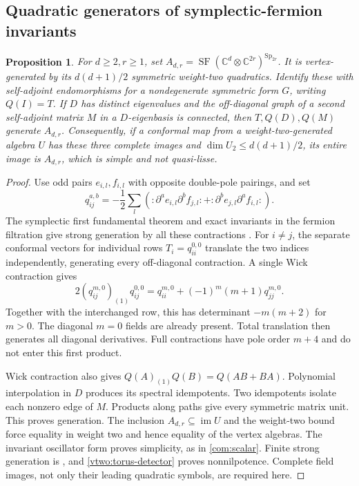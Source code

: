\documentclass[11pt,a4paper]{amsart}
\numberwithin{equation}{section}
\newtheorem{proposition}[theorem]{Proposition}
\theoremstyle{definition}
\theoremstyle{remark}
\newcommand{\C}{\mathbb C}
\newcommand{\SF}{\operatorname{SF}}
\newcommand{\Sp}{\operatorname{Sp}}
\newcommand{\im}{\operatorname{im}}
\begin{document}
\subsection{Quadratic generators of symplectic-fermion invariants}
\begin{proposition}\label{v3:quadratic-generation}
For $d\ge2,r\ge1$, set
$A_{d,r}=\SF(\C^d\otimes\C^{2r})^{\Sp_{2r}}$.
It is vertex-generated by its $d(d+1)/2$ symmetric weight-two
quadratics. Identify these with self-adjoint endomorphisms for a
nondegenerate symmetric form $G$, writing $Q(I)=T$.
If $D$ has distinct eigenvalues and the off-diagonal graph of a second
self-adjoint matrix $M$ in a $D$-eigenbasis is connected, then
$T,Q(D),Q(M)$ generate $A_{d,r}$.
Consequently, if a conformal map from a weight-two-generated algebra
$U$ has these three complete images and $\dim U_2\le d(d+1)/2$,
its entire image is $A_{d,r}$, which is simple and not quasi-lisse.
\end{proposition}
\begin{proof}
Use odd pairs $e_{i,l},f_{i,l}$ with opposite double-pole pairings,
and set
$$
 q_{ij}^{a,b}=-\frac12\sum_l
 (:\partial^ae_{i,l}\partial^bf_{j,l}:
       +:\partial^be_{j,l}\partial^af_{i,l}:).
$$
The symplectic first fundamental theorem and exact invariants in the
fermion filtration give strong generation by all these contractions
\cite[\S3, (3.10)]{CLSF}. For $i\ne j$, the separate conformal vectors for individual rows
$T_i=q_{ii}^{0,0}$ translate the two indices independently, generating
every off-diagonal contraction. A single Wick contraction gives
$$
 2(q_{ij}^{m,0})_{(1)}q_{ij}^{0,0}
     =q_{ii}^{m,0}+(-1)^m(m+1)q_{jj}^{m,0}.
$$
Together with the interchanged row, this has determinant $-m(m+2)$
for $m>0$. The diagonal $m=0$ fields are already present. Total
translation then generates all diagonal derivatives. Full contractions
have pole order $m+4$ and do not enter this first product.

Wick contraction also gives $Q(A)_{(1)}Q(B)=Q(AB+BA)$.
Polynomial interpolation in $D$ produces its spectral idempotents.
Two idempotents isolate each nonzero edge of $M$. Products along paths
give every symmetric matrix unit. This proves generation. The inclusion
$A_{d,r}\subseteq\im U$ and the weight-two bound force equality in
weight two and hence equality of the vertex algebras. The invariant
oscillator form proves simplicity, as in \cref{com:scalar}. Finite strong
generation is \cite[Theorem 3.10]{CLSF}, and \cref{vtwo:torus-detector} proves nonnilpotence. Complete field images,
not only their leading quadratic symbols, are required here.
\end{proof}
\end{document}
